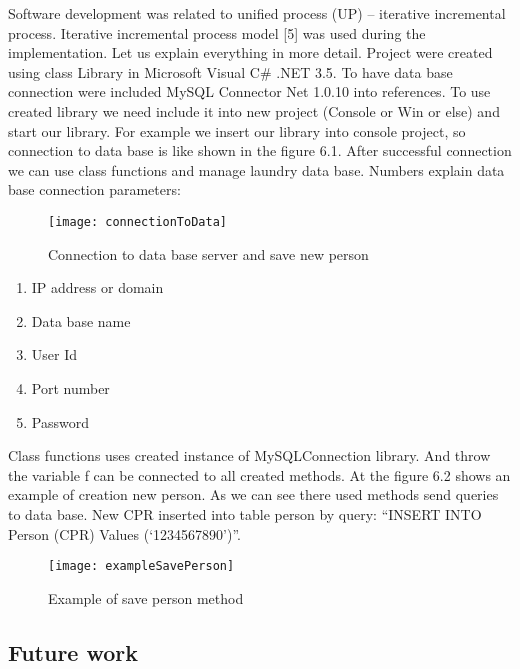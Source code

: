 Software development was related to unified process (UP) – iterative incremental process.  Iterative incremental process model [5] was used during the implementation.  
Let us explain everything in more detail. Project were created using class Library in Microsoft Visual C\# .NET 3.5. To have data base connection were included MySQL Connector Net 1.0.10 into references. To use created library we need include it into new project (Console or Win or else) and start our library. For example we insert our library into console project, so connection to data base is like shown in the figure 6.1. After successful connection we can use class functions and manage laundry data base. 
\newpage
Numbers explain data base connection parameters: 

\begin{figure}[h]
	\centering
		\texttt{[image: connectionToData]}
	\caption{Connection to data base server and save new person}
	\label{fig:planning}
\end{figure}

\begin{enumerate}
	\item IP address or domain
	\item Data base name
	\item User Id
	\item Port number
	\item Password
\end{enumerate}

Class functions uses created instance of MySQLConnection library. And throw the variable f can be connected to all created methods. At the figure 6.2 shows an example of creation new person. As we can see there used methods send queries to data base. New CPR inserted into table person by query: “INSERT INTO Person (CPR) Values (‘1234567890’)”.

\begin{figure}[h]
	\centering
		\texttt{[image: exampleSavePerson]}
	\caption{Example of save person method}
	\label{fig:planning}
\end{figure}

\subsection{Future work}
